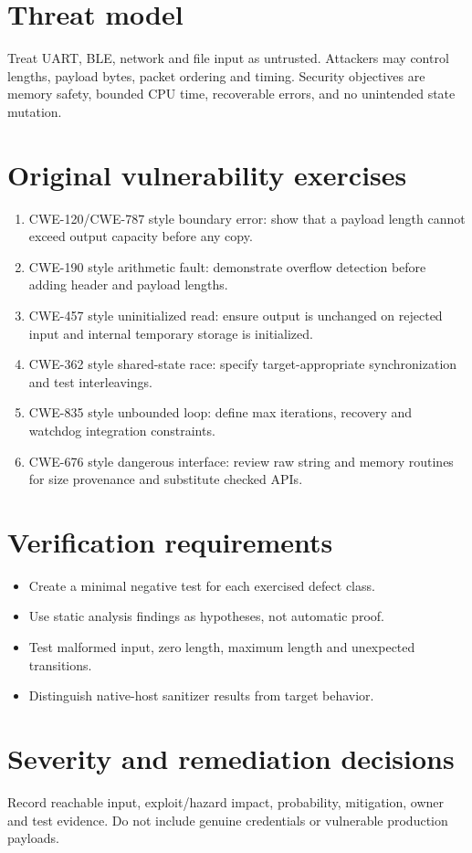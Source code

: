 \documentclass[10pt,letterpaper]{article}
\begin{document}
\makedoctitle
\makedocsummary
\section{Threat model}
Treat UART, BLE, network and file input as untrusted. Attackers may control lengths, payload bytes, packet ordering and timing. Security objectives are memory safety, bounded CPU time, recoverable errors, and no unintended state mutation.
\section{Original vulnerability exercises}
\begin{enumerate}
\item CWE-120/CWE-787 style boundary error: show that a payload length cannot exceed output capacity before any copy.
\item CWE-190 style arithmetic fault: demonstrate overflow detection before adding header and payload lengths.
\item CWE-457 style uninitialized read: ensure output is unchanged on rejected input and internal temporary storage is initialized.
\item CWE-362 style shared-state race: specify target-appropriate synchronization and test interleavings.
\item CWE-835 style unbounded loop: define max iterations, recovery and watchdog integration constraints.
\item CWE-676 style dangerous interface: review raw string and memory routines for size provenance and substitute checked APIs.
\end{enumerate}

\section{Verification requirements}
\begin{itemize}
\item Create a minimal negative test for each exercised defect class.
\item Use static analysis findings as hypotheses, not automatic proof.
\item Test malformed input, zero length, maximum length and unexpected transitions.
\item Distinguish native-host sanitizer results from target behavior.
\end{itemize}

\section{Severity and remediation decisions}
Record reachable input, exploit/hazard impact, probability, mitigation, owner and test evidence. Do not include genuine credentials or vulnerable production payloads.
\end{document}
